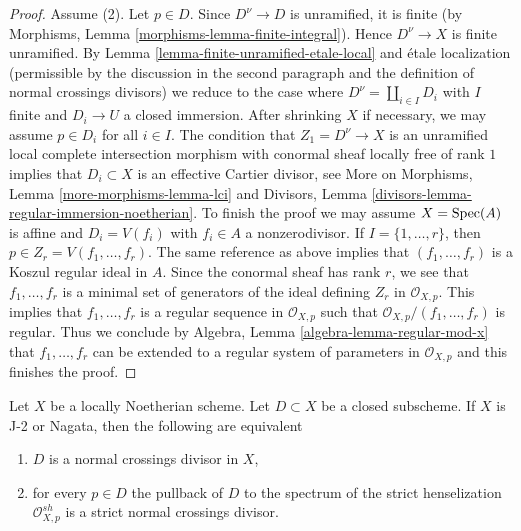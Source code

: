\begin{proof}
\medskip\noindent
Assume (2). Let $p \in D$. Since $D^\nu \to D$ is unramified, it is
finite (by Morphisms, Lemma \ref{morphisms-lemma-finite-integral}).
Hence $D^\nu \to X$ is finite unramified.
By Lemma \ref{lemma-finite-unramified-etale-local}
and \'etale localization (permissible by the discussion
in the second paragraph and the definition of normal
crossings divisors) we reduce to the case where
$D^\nu = \coprod_{i \in I} D_i$
with $I$ finite and $D_i \to U$ a closed immersion.
After shrinking $X$ if necessary, we may assume
$p \in D_i$ for all $i \in I$. The condition that $Z_1 =  D^\nu \to X$ is an
unramified local complete intersection morphism
with conormal sheaf locally free of rank $1$
implies that $D_i \subset X$ is an effective Cartier divisor, see
More on Morphisms, Lemma \ref{more-morphisms-lemma-lci} and
Divisors, Lemma \ref{divisors-lemma-regular-immersion-noetherian}.
To finish the proof we may assume $X = \mathop{\mathrm{Spec}}(A)$ is affine
and $D_i = V(f_i)$ with $f_i \in A$ a nonzerodivisor.
If $I = \{1, \ldots, r\}$, then $p \in Z_r = V(f_1, \ldots, f_r)$.
The same reference as above implies that
$(f_1, \ldots, f_r)$ is a Koszul regular ideal in $A$.
Since the conormal sheaf has rank $r$, we see that
$f_1, \ldots, f_r$ is a minimal set of generators of
the ideal defining $Z_r$ in $\mathcal{O}_{X, p}$.
This implies that $f_1, \ldots, f_r$ is a regular sequence
in $\mathcal{O}_{X, p}$ such that $\mathcal{O}_{X, p}/(f_1, \ldots, f_r)$
is regular. Thus we conclude by
Algebra, Lemma \ref{algebra-lemma-regular-mod-x}
that $f_1, \ldots, f_r$ can be extended to a regular system of parameters
in $\mathcal{O}_{X, p}$ and this finishes the proof.
\end{proof}

\begin{lemma}
\label{lemma-characterize-normal-crossings}
Let $X$ be a locally Noetherian scheme. Let $D \subset X$ be a closed
subscheme. If $X$ is J-2 or Nagata, then the following are equivalent
\begin{enumerate}
\item $D$ is a normal crossings divisor in $X$,
\item for every $p \in D$ the pullback of $D$ to the spectrum of the
strict henselization $\mathcal{O}_{X, p}^{sh}$
is a strict normal crossings divisor.
\end{enumerate}
\end{lemma}

